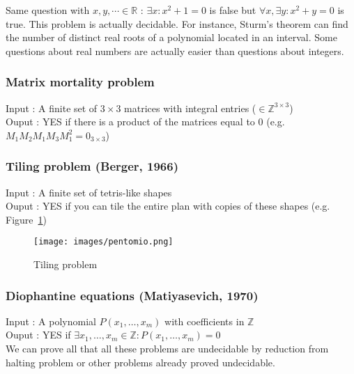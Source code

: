 Same question with $x,y,\cdots \in \mathbb{R}$ :  $\exists x : x^2+1=0$ is false but  $\forall x, \exists y : x^2+y=0$ is true. This problem is actually decidable. For instance, Sturm's theorem can find the number of distinct real roots of a polynomial located in an interval. Some questions about real numbers are actually easier than questions about integers.

\subsubsection{Matrix mortality problem}
Input : A finite set of $3\times3$ matrices with integral entries ($\in \mathbb{Z}^{3\times3}$)\\
Ouput : YES if there is a product of the matrices equal to $0$ (e.g. $M_1M_2M_1M_3M_1^2 = 0_{3\times3}$)

\subsubsection{Tiling problem (Berger, 1966)}
Input : A finite set of tetris-like shapes \\
Ouput : YES if you can tile the entire plan with copies of these shapes (e.g. Figure~\ref{Tiling})
\begin{figure}[!h]
                 \centering\texttt{[image: images/pentomio.png]}
         	\caption{Tiling problem}
        		\label{Tiling}
\end{figure}

\subsubsection{Diophantine equations (Matiyasevich, 1970)}
Input : A polynomial $P(x_1,\ldots, x_m)$ with coefficients in $\mathbb{Z}$ \\
Ouput : YES if $\exists x_1,\ldots, x_m \in \mathbb{Z} : P(x_1,\ldots, x_m) = 0$ \\

We can prove all that all these problems are undecidable by reduction from halting problem or other problems already proved undecidable.